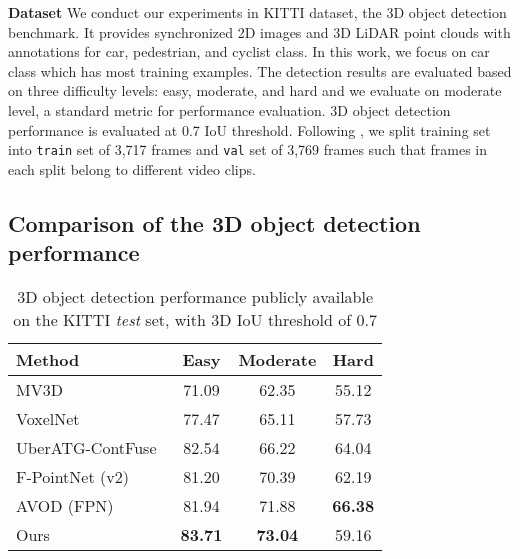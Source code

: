 \documentclass[letterpaper, 10 pt, conference]{ieeeconf}
\newcommand{\subsec}{\quad}
\begin{document}
\textbf{Dataset\subsec} We conduct our experiments in KITTI dataset, the 3D object detection benchmark. It provides synchronized 2D images and 3D LiDAR point clouds with annotations for car, pedestrian, and cyclist class. In this work, we focus on car class which has most training examples. The detection results are evaluated based on three difficulty levels: easy, moderate, and hard and we evaluate on moderate level, a standard metric for performance evaluation. 3D object detection performance is evaluated at 0.7 IoU threshold. Following \cite{qi_frustum_2018,ku_joint_2017,cai16mscnn}, we split training set into {\tt train} set of 3,717 frames and {\tt val} set of 3,769 frames such that frames in each split belong to different video clips.

\subsection{Comparison of the 3D object detection performance \label{sec:exp1}}

\begin{table}[t]
\begin{center}
\begin{tabular}{@{}>{}m{3cm}ccc@{}}
\toprule
Method & Easy & Moderate & Hard\\
\midrule
MV3D~\cite{cvpr17chen} 				& 71.09 		& 62.35 	 & 55.12\\
VoxelNet~\cite{zhou2017voxelnet}   			& 77.47 	   & 65.11 		& 57.73\\
UberATG-ContFuse~\cite{liang_deep_2018}  & 82.54 	   & 66.22 		& 64.04\\
F-PointNet (v2)~\cite{qi_frustum_2018}  & 81.20 		& 70.39 	 & 62.19\\
AVOD (FPN)~\cite{ku_joint_2017} 		& 81.94 	    & 71.88 	& \textbf{66.38}\\
Ours 				 & \textbf{83.71} 		& \textbf{73.04} 	 & 59.16\\
\bottomrule
\end{tabular}
\end{center}
\caption{3D object detection performance publicly available on the KITTI \textit{test} set, with 3D IoU threshold of 0.7}
\label{tab:comp_performance}
\end{table}
\end{document}
